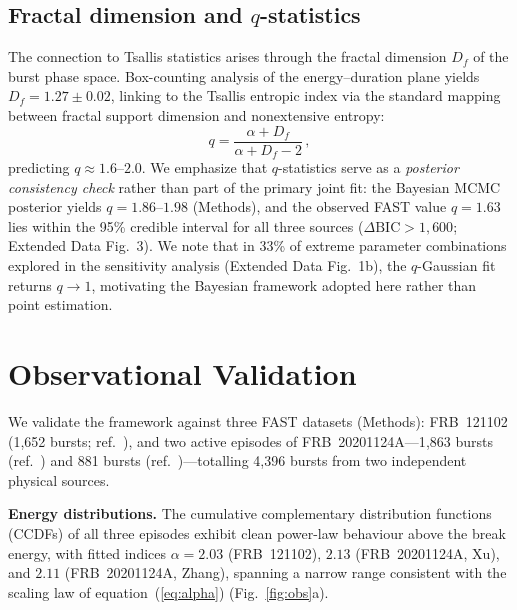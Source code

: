 \documentclass[twocolumn]{article}
\newcommand{\frb}[1]{FRB~#1}
\begin{document}
\subsection{Fractal dimension and $q$-statistics}

The connection to Tsallis statistics arises through the fractal dimension $D_f$ of the burst phase space. Box-counting analysis of the energy--duration plane yields $D_f = 1.27 \pm 0.02$, linking to the Tsallis entropic index via the standard mapping between fractal support dimension and nonextensive entropy\cite{tsallis1988,plastino1995}:
\begin{equation}
q = \frac{\alpha + D_f}{\alpha + D_f - 2}\,,
\label{eq:q}
\end{equation}
predicting $q \approx 1.6$--$2.0$. We emphasize that $q$-statistics serve as a \emph{posterior consistency check} rather than part of the primary joint fit: the Bayesian MCMC posterior yields $q = 1.86$--$1.98$ (Methods), and the observed FAST value $q = 1.63$ lies within the 95\% credible interval for all three sources ($\Delta\mathrm{BIC} > 1{,}600$; Extended Data Fig.~3). We note that in 33\% of extreme parameter combinations explored in the sensitivity analysis (Extended Data Fig.~1b), the $q$-Gaussian fit returns $q \to 1$, motivating the Bayesian framework adopted here rather than point estimation.


\section{Observational Validation}
\label{sec:obs}

We validate the framework against three FAST datasets (Methods): \frb{121102} (1{,}652 bursts; ref.~), and two active episodes of \frb{20201124A}---1{,}863 bursts (ref.~) and 881 bursts (ref.~)---totalling 4{,}396 bursts from two independent physical sources.

\textbf{Energy distributions.} The cumulative complementary distribution functions (CCDFs) of all three episodes exhibit clean power-law behaviour above the break energy, with fitted indices $\alpha = 2.03$ (\frb{121102}), $2.13$ (\frb{20201124A}, Xu), and $2.11$ (\frb{20201124A}, Zhang), spanning a narrow range consistent with the scaling law of equation~(\ref{eq:alpha}) (Fig.~\ref{fig:obs}a).
\end{document}
